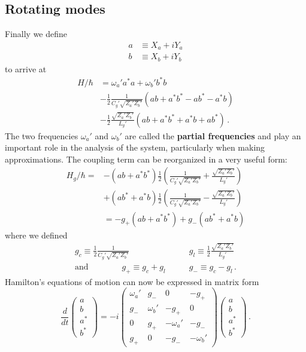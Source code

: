 \documentclass{article}
\begin{document}
\subsection{Rotating modes}

Finally we define
\begin{align}
  a &\equiv X_a + i Y_a \nonumber \\
  b &\equiv X_b + i Y_b
\end{align}
to arrive at
\begin{align}
  H / \hbar
  &= \omega_a' a^* a + \omega_b' b^* b \nonumber \\
  & - \frac{1}{2} \frac{1}{C_g' \sqrt{Z_a' Z_b'}} (ab + a^* b^* - a b^* - a^* b) \nonumber \\
  &- \frac{1}{2} \frac{\sqrt{Z_a' Z_b'}}{L_g'} (ab + a^* b^* + a^* b + a b^*)
  \, .
\end{align}
The two frequencies $\omega_a'$ and $\omega_b'$ are called the \textbf{partial frequencies} and play an important role in the analysis of the system, particularly when making approximations.
The coupling term can be reorganized in a very useful form:
\begin{align}
  H_g / \hbar =
  &- \left( a b + a^* b^* \right)
    \frac{1}{2} \left(
      \frac{1}{C_g' \sqrt{Z_a' Z_b'}} + \frac{\sqrt{Z_a' Z_b'}}{L_g'}
    \right) \nonumber \\
  &+ \left( a b^* + a^* b \right)
    \frac{1}{2} \left(
      \frac{1}{C_g' \sqrt{Z_a' Z_b'}} - \frac{\sqrt{Z_a' Z_b'}}{L_g'}
    \right) \nonumber \\
  &= -g_+ (ab + a^* b^*) + g_- (ab^* + a^* b)
\end{align}
where we defined
\begin{align}
  g_c \equiv \frac{1}{2} \frac{1}{C_g' \sqrt{Z_a' Z_b'}} &\qquad
  g_l \equiv \frac{1}{2} \frac{\sqrt{Z_a' Z_b'}}{L_g'} \nonumber \\
  \text{and} \qquad \qquad
  g_+ \equiv g_c + g_l &\qquad g_- \equiv g_c - g_l
  \, .
\end{align}
Hamilton's equations of motion can now be expressed in matrix form
\begin{equation*}
  \frac{d}{dt}
  \left( \begin{array}{c} a \\ b \\ a^* \\ b^* \end{array} \right)
  = -i \left( \begin{array}{cccc}
    \omega_a' & g_- & 0 & -g_+ \\
    g_- & \omega_b' & -g_+ & 0 \\
    0 & g_+ & -\omega_a' & -g _- \\
    g_+ & 0 & -g_- & -\omega_b'
  \end{array} \right)
  \left( \begin{array}{c} a \\ b \\ a^* \\ b^* \end{array} \right) \, .
\end{equation*}
\end{document}
